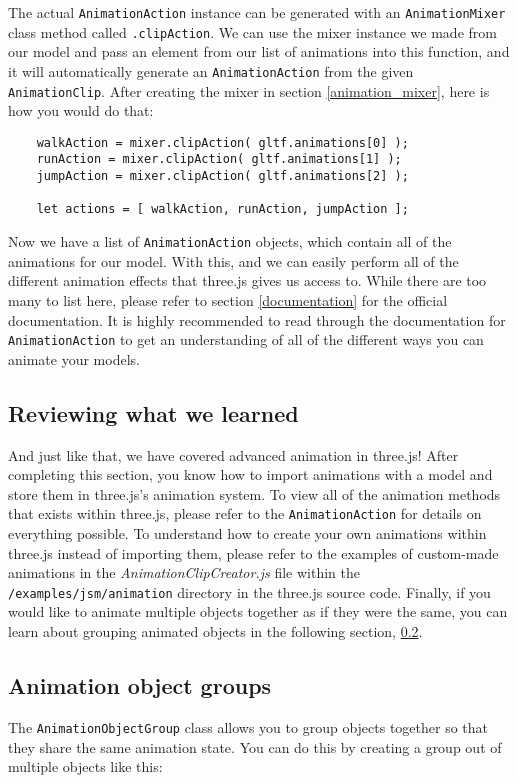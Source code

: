 \documentclass[10pt,final,journal,compsoc]{IEEEtran}
\begin{document}
    The actual \verb|AnimationAction| instance can be generated with an \verb|AnimationMixer| class method called \verb|.clipAction|. We can use the mixer instance we made from our model and pass an element from our list of animations into this function, and it will automatically generate an \verb|AnimationAction| from the given \verb|AnimationClip|. After creating the mixer in section \ref{animation_mixer}, here is how you would do that:
    
    \begin{lstlisting}
    walkAction = mixer.clipAction( gltf.animations[0] );
    runAction = mixer.clipAction( gltf.animations[1] );
    jumpAction = mixer.clipAction( gltf.animations[2] );
    
    let actions = [ walkAction, runAction, jumpAction ];
    \end{lstlisting}
    
    Now we have a list of \verb|AnimationAction| objects, which contain all of the animations for our model. With this, and we can easily perform all of the different animation effects that three.js gives us access to. While there are too many to list here, please refer to section \ref{documentation} for the official documentation. It is highly recommended to read through the documentation for \verb|AnimationAction| to get an understanding of all of the different ways you can animate your models.
    
    
    \subsection{Reviewing what we learned}
    And just like that, we have covered advanced animation in three.js! After completing this section, you know how to import animations with a model and store them in three.js's animation system. To view all of the animation methods that exists within three.js, please refer to the \verb|AnimationAction| for details on everything possible. To understand how to create your own animations within three.js instead of importing them, please refer to the examples of custom-made animations in the \textit{AnimationClipCreator.js} file within the \verb|/examples/jsm/animation| directory in the three.js source code. Finally, if you would like to animate multiple objects together as if they were the same, you can learn about grouping animated objects in the following section, \ref{animation_groups}.
    
    \subsection{Animation object groups} \label{animation_groups}
    The \verb|AnimationObjectGroup| class allows you to group objects together so that they share the same animation state. You can do this by creating a group out of multiple objects like this:
    
\end{document}
